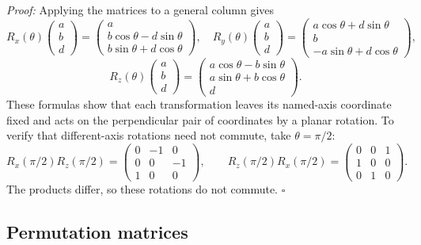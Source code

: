 \documentclass[a4paper,11pt,abstract=true]{scrartcl}
\theoremstyle{dotlessP}
\theoremstyle{dotlessS}
\theoremstyle{remark}
\theoremstyle{definition}
\begin{document}
\begin{claim_box}
\textit{Proof:} Applying the matrices to a general column gives
\[
R_x(\theta)\begin{pmatrix}a\\b\\d\end{pmatrix}
=\begin{pmatrix}a\\b\cos\theta-d\sin\theta\\b\sin\theta+d\cos\theta\end{pmatrix},
\quad
R_y(\theta)\begin{pmatrix}a\\b\\d\end{pmatrix}
=\begin{pmatrix}a\cos\theta+d\sin\theta\\b\\-a\sin\theta+d\cos\theta\end{pmatrix},
\]
\[
R_z(\theta)\begin{pmatrix}a\\b\\d\end{pmatrix}
=\begin{pmatrix}a\cos\theta-b\sin\theta\\a\sin\theta+b\cos\theta\\d\end{pmatrix}.
\]
These formulas show that each transformation leaves its named-axis
coordinate fixed and acts on the perpendicular pair of coordinates by
a planar rotation. To verify that different-axis rotations need not
commute, take $\theta=\pi/2$:
\[
R_x(\pi/2)R_z(\pi/2)=
\begin{pmatrix}0&-1&0\\0&0&-1\\1&0&0\end{pmatrix},
\qquad
R_z(\pi/2)R_x(\pi/2)=
\begin{pmatrix}0&0&1\\1&0&0\\0&1&0\end{pmatrix}.
\]
The products differ, so these rotations do not commute. \hfill$\square$
\end{claim_box}

\subsection{Permutation matrices}
\end{document}
